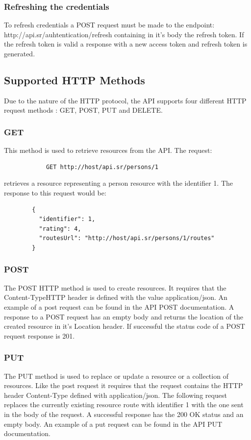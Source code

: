     \subsubsection*{Refreshing the credentials}
    To refresh credentials a POST request must be made to the endpoint: http://api.sr/auhtentication/refresh containing in it's
    body the refresh token. If the refresh token is valid a response with a new access token and refresh token is generated.

    \subsection{Supported HTTP Methods}
        Due to the nature of the HTTP protocol, the API supports four different HTTP request methods \cite{apihttpverbsdocs}: GET, POST, PUT and DELETE.
        
        \subsubsection*{GET}
        This method is used to retrieve resources from the API. The request: 
        \begin{verbatim}
            GET http://host/api.sr/persons/1 
        \end{verbatim}
        \vspace{-\baselineskip}
        retrieves a resource representing a person resource with the identifier 1. 
        The response to this request would be:
        \begin{lstlisting}
        {
          "identifier": 1,
          "rating": 4,
          "routesUrl": "http://host/api.sr/persons/1/routes"
        }
        \end{lstlisting}

        \subsubsection*{POST}
        The POST HTTP method is used to create resources. It requires that the Content-Type\cite{contenttype}HTTP header is 
        defined with the value application/json\cite{applicationjson}. An example of a post request can be found in the 
        API POST\cite{apipostdocs} documentation. A response to a POST request has an empty body and returns the 
        location of the created resource in it's Location header. If successful the status code of a POST request response is 201.  
            
        \subsubsection*{PUT}
        The PUT method is used to replace or update a resource or a collection of resources. Like the post request it requires 
        that the request contains the HTTP header Content-Type defined with application/json.
        The following request replaces the currently existing resource route with identifier 1 with the one sent in 
        the body of the request. A successful response has the 200 OK status and an empty body. An example of a put 
        request can be found in the API PUT\cite{apiputdocs} documentation.

